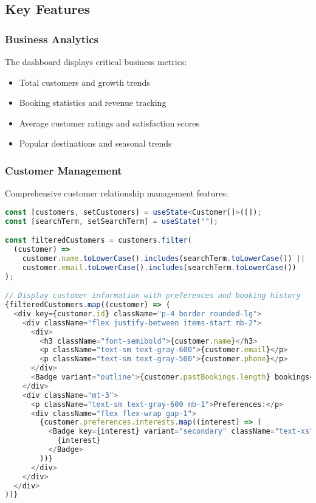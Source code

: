 \documentclass[12pt,a4paper]{article}
\begin{document}
\subsection{Key Features}

\subsubsection{Business Analytics}
The dashboard displays critical business metrics:
\begin{itemize}
    \item Total customers and growth trends
    \item Booking statistics and revenue tracking
    \item Average customer ratings and satisfaction scores
    \item Popular destinations and seasonal trends
\end{itemize}

\subsubsection{Customer Management}
Comprehensive customer relationship management features:
\begin{lstlisting}[language=typescript, caption=Customer Management Implementation]
const [customers, setCustomers] = useState<Customer[]>([]);
const [searchTerm, setSearchTerm] = useState("");

const filteredCustomers = customers.filter(
  (customer) =>
    customer.name.toLowerCase().includes(searchTerm.toLowerCase()) ||
    customer.email.toLowerCase().includes(searchTerm.toLowerCase())
);

// Display customer information with preferences and booking history
{filteredCustomers.map((customer) => (
  <div key={customer.id} className="p-4 border rounded-lg">
    <div className="flex justify-between items-start mb-2">
      <div>
        <h3 className="font-semibold">{customer.name}</h3>
        <p className="text-sm text-gray-600">{customer.email}</p>
        <p className="text-sm text-gray-500">{customer.phone}</p>
      </div>
      <Badge variant="outline">{customer.pastBookings.length} bookings</Badge>
    </div>
    <div className="mt-3">
      <p className="text-sm text-gray-600 mb-1">Preferences:</p>
      <div className="flex flex-wrap gap-1">
        {customer.preferences.interests.map((interest) => (
          <Badge key={interest} variant="secondary" className="text-xs">
            {interest}
          </Badge>
        ))}
      </div>
    </div>
  </div>
))}
\end{lstlisting}
\end{document}
